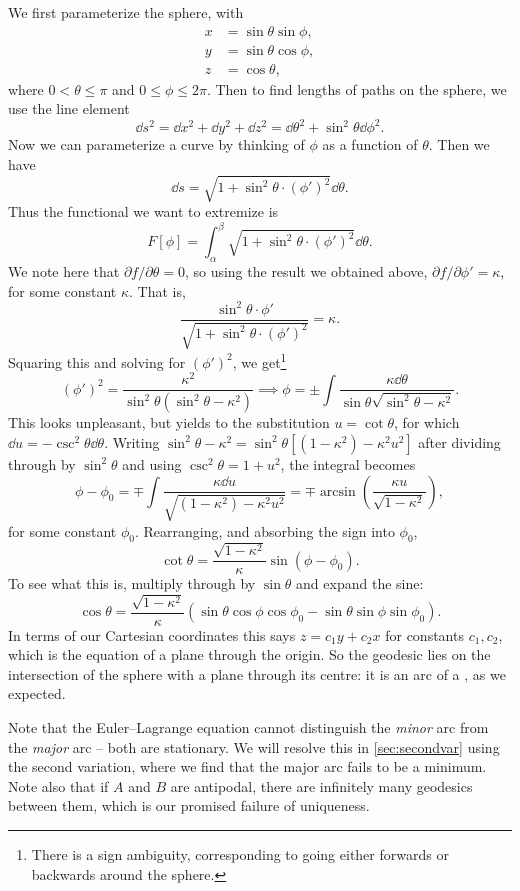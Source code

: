 \begin{example}
	We first parameterize the sphere, with
	\begin{align*}
		x &= \sin \theta \sin \phi, \\
		y &= \sin \theta \cos \phi, \\
		z &= \cos \theta,
	\end{align*}
	where $0 < \theta \leq \pi$ and $0 \leq \phi \leq 2 \pi$. Then to find lengths of paths on the sphere, we use the line element
	$$
	\dd s^2 = \dd x^2 + \dd y^2 + \dd z^2 = \dd \theta^2 + \sin^2 \theta \dd \phi^2.
	$$
	Now we can parameterize a curve by thinking of $\phi$ as a function of $\theta$. Then we have
	$$
	\dd s = \sqrt{1 + \sin^2 \theta \cdot (\phi')^2} \dd \theta.
	$$
	Thus the functional we want to extremize is
	$$
	F[\phi] = \int_{\alpha}^{\beta} \sqrt{1 + \sin^2 \theta \cdot (\phi')^2} \dd \theta.
	$$
	We note here that $\partial f/ \partial \theta = 0$, so using the result we obtained above, $\partial f/\partial \phi' = \kappa$, for some constant $\kappa$. That is,
	$$
\frac{\sin^2 \theta \cdot \phi'}{\sqrt{1 + \sin^2 \theta \cdot (\phi')^2}} = \kappa.
	$$
	Squaring this and solving for $(\phi')^2$, we get\footnote{There is a sign ambiguity, corresponding to going either forwards or backwards around the sphere.}
	$$
	(\phi')^2 = \frac{\kappa^2}{\sin^2 \theta \left(\sin^2 \theta - \kappa^2\right)} \implies \phi = \pm \int \frac{\kappa \dd \theta}{\sin \theta \sqrt{\sin^2 \theta - \kappa^2}}.
	$$
	This looks unpleasant, but yields to the substitution $u = \cot\theta$, for which $\dd u = -\csc^2\theta \dd\theta$. Writing $\sin^2\theta - \kappa^2 = \sin^2\theta\left[(1 - \kappa^2) - \kappa^2 u^2\right]$ after dividing through by $\sin^2\theta$ and using $\csc^2\theta = 1 + u^2$, the integral becomes
	$$
	\phi - \phi_0 = \mp\int \frac{\kappa \dd u}{\sqrt{(1 - \kappa^2) - \kappa^2 u^2}} = \mp \arcsin\left(\frac{\kappa u}{\sqrt{1 - \kappa^2}}\right),
	$$
	for some constant $\phi_0$. Rearranging, and absorbing the sign into $\phi_0$,
	$$
	\cot\theta = \frac{\sqrt{1 - \kappa^2}}{\kappa}\sin(\phi - \phi_0).
	$$
	To see what this is, multiply through by $\sin\theta$ and expand the sine:
	$$
	\cos\theta = \frac{\sqrt{1 - \kappa^2}}{\kappa}\left(\sin\theta\cos\phi\cos\phi_0 - \sin\theta\sin\phi \sin\phi_0\right).
	$$
	In terms of our Cartesian coordinates this says $z = c_1 y + c_2 x$ for constants $c_1, c_2$, which is the equation of a plane through the origin. So the geodesic lies on the intersection of the sphere with a plane through its centre: it is an arc of a , as we expected.

	Note that the Euler--Lagrange equation cannot distinguish the \emph{minor} arc from the \emph{major} arc -- both are stationary. We will resolve this in \autoref{sec:secondvar} using the second variation, where we find that the major arc fails to be a minimum. Note also that if $A$ and $B$ are antipodal, there are infinitely many geodesics between them, which is our promised failure of uniqueness.
\end{example}

